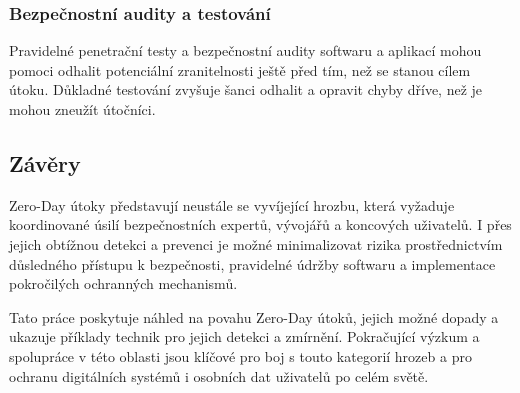 \documentclass[11pt, conference, a4paper]{IEEEtran}
\begin{document}
\subsubsection{Bezpečnostní audity a testování} Pravidelné penetrační testy a bezpečnostní audity softwaru a aplikací mohou pomoci odhalit potenciální zranitelnosti ještě před tím, než se stanou cílem útoku. Důkladné testování zvyšuje šanci odhalit a opravit chyby dříve, než je mohou zneužít útočníci.

\subsection{Závěry}
Zero-Day útoky představují neustále se vyvíjející hrozbu, která vyžaduje koordinované úsilí bezpečnostních expertů, vývojářů a koncových uživatelů. I přes jejich obtížnou detekci a prevenci je možné minimalizovat rizika prostřednictvím důsledného přístupu k bezpečnosti, pravidelné údržby softwaru a implementace pokročilých ochranných mechanismů.

Tato práce poskytuje náhled na povahu Zero-Day útoků, jejich možné dopady a ukazuje příklady technik pro jejich detekci a zmírnění. Pokračující výzkum a spolupráce v této oblasti jsou klíčové pro boj s touto kategorií hrozeb a pro ochranu digitálních systémů i osobních dat uživatelů po celém světě.


\ifCLASSOPTIONcaptionsoff
  \newpage
\fi





\end{document}
